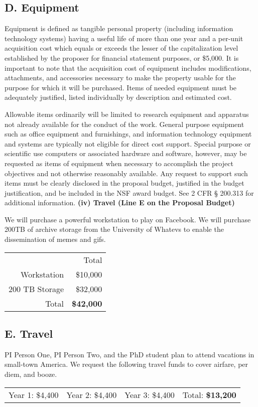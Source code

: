 \subsection*{D. Equipment}
\begin{pappg}
    Equipment is defined as tangible personal property (including
    information technology systems) having a useful life of more than one
    year and a per-unit acquisition cost which equals or exceeds the lesser
    of the capitalization level established by the proposer for financial
    statement purposes, or \$5,000. It is important to note that the
    acquisition cost of equipment includes modifications, attachments, and
    accessories necessary to make the property usable for the purpose for
    which it will be purchased. Items of needed equipment must be adequately
    justified, listed individually by description and estimated cost.

    Allowable items ordinarily will be limited to research equipment and
    apparatus not already available for the conduct of the work. General
    purpose equipment such as office equipment and furnishings, and
    information technology equipment and systems are typically not eligible
    for direct cost support. Special purpose or scientific use computers or
    associated hardware and software, however, may be requested as items of
    equipment when necessary to accomplish the project objectives and not
    otherwise reasonably available. Any request to support such items must
    be clearly disclosed in the proposal budget, justified in the budget
    justification, and be included in the NSF award budget. See 2 CFR §
    200.313 for additional information. \textbf{(iv) Travel (Line E on the
    Proposal Budget) }

\end{pappg}
We will purchase a powerful workstation to play on Facebook. We will purchase 200TB of archive storage from the University of Whatevs to enable the dissemination of memes and gifs.
\newline
\begin{table}[H]
\begin{tabular}[c]{r | r}
 & Total\\
Workstation     & \$10,000\\
200 TB Storage  & \$32,000\\
\hline
Total           & \textbf{\$42,000}
\end{tabular}
\end{table}

\subsection*{E. Travel}
PI Person One, PI Person Two, and the PhD student plan to attend vacations in small-town America. We request the following travel funds to cover airfare, per diem, and booze.
\newline
\begin{table}[H]
\begin{tabular}[c]{cccc}
Year 1: \$4,400  & Year 2: \$4,400    & Year 3: \$4,400    & Total: \textbf{\$13,200}
\end{tabular}
\end{table}

